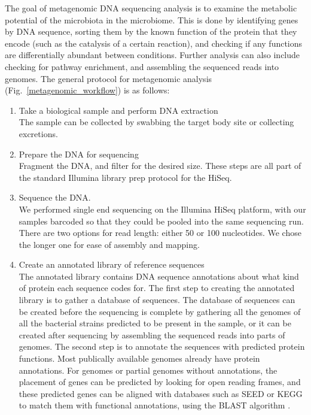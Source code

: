 The goal of metagenomic DNA sequencing analysis is to examine the metabolic potential of the microbiota in the microbiome. This is done by identifying genes by DNA sequence, sorting them by the known function of the protein that they encode (such as the catalysis of a certain reaction), and checking if any functions are differentially abundant between conditions. Further analysis can also include checking for pathway enrichment, and assembling the sequenced reads into genomes. The general protocol for metagenomic analysis (Fig.~\ref{metagenomic_workflow}) is as follows:

\begin{enumerate}
\item Take a biological sample and perform DNA extraction\\
The sample can be collected by swabbing the target body site or collecting excretions.

\item Prepare the DNA for sequencing\\
Fragment the DNA, and filter for the desired size. These steps are all part of the standard Illumina library prep protocol for the HiSeq.

\item Sequence the DNA.\\
We performed single end sequencing on the Illumina HiSeq platform, with our samples barcoded so that they could be pooled into the same sequencing run. There are two options for read length: either 50 or 100 nucleotides. We chose the longer one for ease of assembly and mapping.

\item Create an annotated library of reference sequences\\
The annotated library contains DNA sequence annotations about what kind of protein each sequence codes for. The first step to creating the annotated library is to gather a database of sequences. The database of sequences can be created before the sequencing is complete by gathering all the genomes of all the bacterial strains predicted to be present in the sample, or it can be created after sequencing by assembling the sequenced reads into parts of genomes. The second step is to annotate the sequences with predicted protein functions. Most publically available genomes already have protein annotations. For genomes or partial genomes without annotations, the placement of genes can be predicted by looking for open reading frames, and these predicted genes can be aligned with databases such as SEED \cite{overbeek2005subsystems} or KEGG \cite{kanehisa2000kegg} to match them with functional annotations, using the BLAST algorithm \cite{altschul1990basic}.


\end{enumerate}
